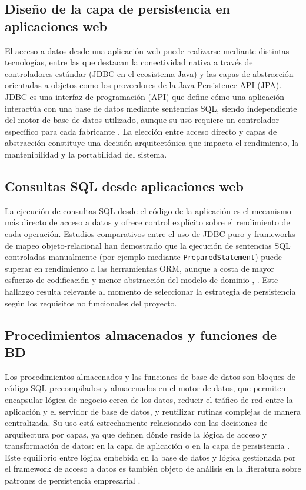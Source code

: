 \subsection{Diseño de la capa de persistencia en aplicaciones web}

El acceso a datos desde una aplicación web puede realizarse mediante distintas tecnologías, entre las que destacan la conectividad nativa a través de controladores estándar (JDBC en el ecosistema Java) y las capas de abstracción orientadas a objetos como los proveedores de la Java Persistence API (JPA). JDBC es una interfaz de programación (API) que define cómo una aplicación interactúa con una base de datos mediante sentencias SQL, siendo independiente del motor de base de datos utilizado, aunque su uso requiere un controlador específico para cada fabricante \cite{ubt_jpa}. La elección entre acceso directo y capas de abstracción constituye una decisión arquitectónica que impacta el rendimiento, la mantenibilidad y la portabilidad del sistema.

\subsection{Consultas SQL desde aplicaciones web}

La ejecución de consultas SQL desde el código de la aplicación es el mecanismo más directo de acceso a datos y ofrece control explícito sobre el rendimiento de cada operación. Estudios comparativos entre el uso de JDBC puro y frameworks de mapeo objeto-relacional han demostrado que la ejecución de sentencias SQL controladas manualmente (por ejemplo mediante \texttt{PreparedStatement}) puede superar en rendimiento a las herramientas ORM, aunque a costa de mayor esfuerzo de codificación y menor abstracción del modelo de dominio \cite{doaj_orm}, \cite{vanzyl_orm}. Este hallazgo resulta relevante al momento de seleccionar la estrategia de persistencia según los requisitos no funcionales del proyecto.

\subsection{Procedimientos almacenados y funciones de BD}

Los procedimientos almacenados y las funciones de base de datos son bloques de código SQL precompilados y almacenados en el motor de datos, que permiten encapsular lógica de negocio cerca de los datos, reducir el tráfico de red entre la aplicación y el servidor de base de datos, y reutilizar rutinas complejas de manera centralizada. Su uso está estrechamente relacionado con las decisiones de arquitectura por capas, ya que definen dónde reside la lógica de acceso y transformación de datos: en la capa de aplicación o en la capa de persistencia \cite{ubt_jpa}. Este equilibrio entre lógica embebida en la base de datos y lógica gestionada por el framework de acceso a datos es también objeto de análisis en la literatura sobre patrones de persistencia empresarial \cite{jcsi_orm}.

